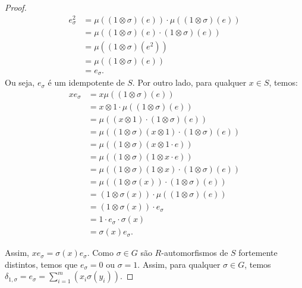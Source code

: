 \begin{teo}
\begin{proof}
\begin{align*}
    e_\sigma^2   &= \mu\left( (1\otimes \sigma)(e) \right)\cdot \mu\left( (1\otimes \sigma)(e) \right) \\
            &= \mu\left( (1\otimes \sigma)(e) \cdot  (1\otimes \sigma)(e)  \right) \\
            &= \mu\left( (1\otimes \sigma)(e^2) \right) \\
            &= \mu\left( (1\otimes \sigma)(e) \right) \\
            &= e_\sigma.
\end{align*}Ou seja, $e_\sigma$ é um idempotente de $S$. Por outro lado, para qualquer $x\in S$, temos:
\begin{align*}
    xe_\sigma    &= x\mu\left( (1\otimes \sigma)(e) \right) \\
            &= x\otimes 1 \cdot \mu\left( (1\otimes \sigma)(e) \right) \\
            &= \mu\left( (x\otimes 1) \cdot (1\otimes \sigma)(e) \right) \\
            &= \mu\left( (1\otimes \sigma)(x \otimes 1) \cdot (1\otimes \sigma)(e) \right) \\
            &= \mu\left( (1\otimes \sigma)(x\otimes 1 \cdot e) \right) \\
            &= \mu\left( (1\otimes \sigma)(1\otimes x \cdot e) \right) \\
            &= \mu\left( (1\otimes \sigma)(1\otimes x) \cdot (1\otimes \sigma)(e) \right)\\
            &= \mu\left( (1\otimes \sigma(x)) \cdot (1\otimes \sigma)(e) \right) \\
            &= \left( 1\otimes \sigma(x) \right) \cdot \mu\left((1\otimes \sigma)(e)\right) \\
            &= \left( 1\otimes \sigma(x) \right) \cdot e_\sigma \\
            &= 1\cdot e_\sigma \cdot \sigma(x) \\
            &= \sigma(x)e_\sigma.
\end{align*}

Assim, $xe_\sigma=\sigma(x)e_\sigma$. Como $\sigma\in G$ são $R$-automorfismos de $S$ fortemente distintos, temos que $e_\sigma=0$ ou $\sigma=1$. Assim, para qualquer $\sigma\in G$, temos $\delta_{1,\sigma}=e_\sigma=\sum_{i=1}^{m}\left( x_i \sigma(y_i) \right)$. \par 




\end{proof}
\end{teo}
